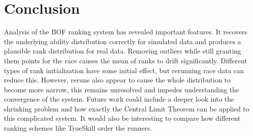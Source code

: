 \section{Conclusion}
Analysis of the BOF ranking system has revealed important features. It recovers the underlying ability distribution correctly for simulated data and produces a plausible rank distribution for real data. Removing outliers while still granting them points for the race causes the mean of ranks to drift significantly. Different types of rank initialization have some initial effect, but rerunning race data can reduce this. However, reruns also appear to cause the whole distribution to become more narrow, this remains unresolved and impedes understanding the convergence of the system. Future work could include a deeper look into the shrinking problem and how exactly the Central Limit Theorem can be applied to this complicated system. It would also be interesting to compare how different ranking schemes like TrueSkill order the runners.